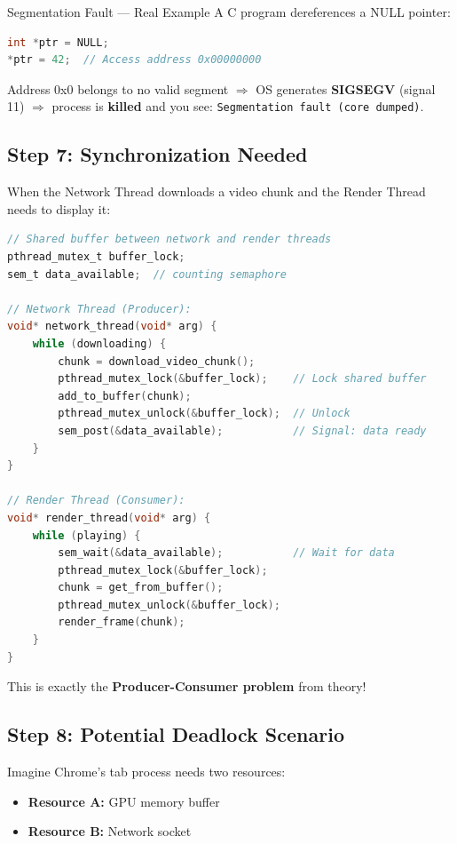 \documentclass[12pt,a4paper]{article}
\begin{document}
\begin{warningbox}{Segmentation Fault --- Real Example}
A C program dereferences a NULL pointer:
\begin{lstlisting}[language=C]
int *ptr = NULL;
*ptr = 42;  // Access address 0x00000000
\end{lstlisting}
Address 0x0 belongs to no valid segment $\Rightarrow$ OS generates \textbf{SIGSEGV} (signal 11) $\Rightarrow$ process is \textbf{killed} and you see: \texttt{Segmentation fault (core dumped)}.
\end{warningbox}

\subsection{Step 7: Synchronization Needed}

When the Network Thread downloads a video chunk and the Render Thread needs to display it:

\begin{lstlisting}[language=C]
// Shared buffer between network and render threads
pthread_mutex_t buffer_lock;
sem_t data_available;  // counting semaphore

// Network Thread (Producer):
void* network_thread(void* arg) {
    while (downloading) {
        chunk = download_video_chunk();
        pthread_mutex_lock(&buffer_lock);    // Lock shared buffer
        add_to_buffer(chunk);
        pthread_mutex_unlock(&buffer_lock);  // Unlock
        sem_post(&data_available);           // Signal: data ready
    }
}

// Render Thread (Consumer):
void* render_thread(void* arg) {
    while (playing) {
        sem_wait(&data_available);           // Wait for data
        pthread_mutex_lock(&buffer_lock);
        chunk = get_from_buffer();
        pthread_mutex_unlock(&buffer_lock);
        render_frame(chunk);
    }
}
\end{lstlisting}

This is exactly the \textbf{Producer-Consumer problem} from theory!

\subsection{Step 8: Potential Deadlock Scenario}

Imagine Chrome's tab process needs two resources:
\begin{itemize}[leftmargin=*]
    \item \textbf{Resource A:} GPU memory buffer
    \item \textbf{Resource B:} Network socket
\end{itemize}
\end{document}
